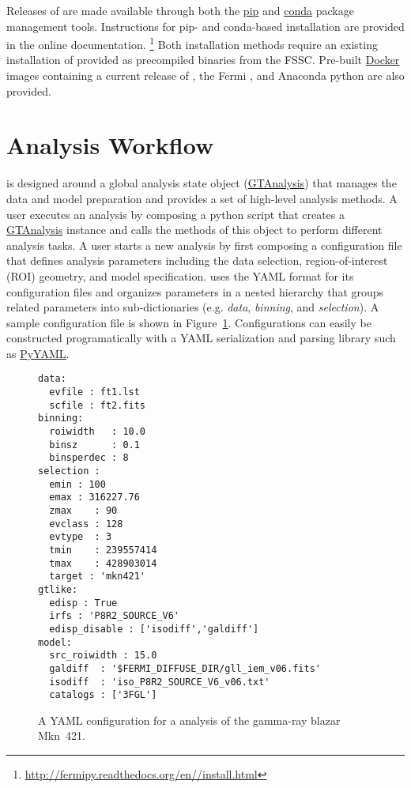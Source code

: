\documentclass{PoS}
\newcommand{\url}[1]{\href{#1}{#1}}
\begin{document}
Releases of {\fermipy} are made available through both the
\href{https://pip.pypa.io/en/latest/}{pip} and
\href{https://conda.io/docs/index.html}{conda} package management
tools.  Instructions for pip- and conda-based installation are
provided in the online documentation.
\footnote{\url{http://fermipy.readthedocs.org/en/\version/install.html}}
Both installation methods require an existing installation of
{\stools} provided as precompiled binaries from the FSSC.  Pre-built
\href{https://www.docker.com}{Docker} images containing a current
release of {\fermipy}, the Fermi {\stools}, and Anaconda python are
also provided.

\section{Analysis Workflow}\label{sec:analysis}

{\fermipy} is designed around a global analysis state object
(\href{http://fermipy.readthedocs.io/en/\version/fermipy.html\#fermipy.gtanalysis.GTAnalysis}{GTAnalysis})
that manages the data and model preparation and provides a set of
high-level analysis methods.  A user executes an analysis by composing
a python script that creates a
\href{http://fermipy.readthedocs.io/en/\version/fermipy.html\#fermipy.gtanalysis.GTAnalysis}{GTAnalysis}
instance and calls the methods of this object to perform different
analysis tasks.  A user starts a new analysis by first composing a
configuration file that defines analysis parameters including the data
selection, region-of-interest (ROI) geometry, and model specification.
{\fermipy} uses the YAML format for its configuration files and
organizes parameters in a nested hierarchy that groups related
parameters into sub-dictionaries (e.g. \textit{data},
\textit{binning}, and \textit{selection}).
A sample configuration file is shown
in Figure~\ref{fig:fermipy_config}.  Configurations can easily be
constructed programatically with a YAML serialization and parsing
library such as \href{http://pyyaml.org/wiki/PyYAML}{PyYAML}.

\begin{figure}[t]
\begin{lstlisting}
data:
  evfile : ft1.lst
  scfile : ft2.fits
binning:
  roiwidth   : 10.0
  binsz      : 0.1
  binsperdec : 8
selection :
  emin : 100
  emax : 316227.76
  zmax    : 90
  evclass : 128
  evtype  : 3
  tmin    : 239557414
  tmax    : 428903014
  target : 'mkn421'
gtlike:
  edisp : True
  irfs : 'P8R2_SOURCE_V6'
  edisp_disable : ['isodiff','galdiff']
model:
  src_roiwidth : 15.0
  galdiff  : '$FERMI_DIFFUSE_DIR/gll_iem_v06.fits'
  isodiff  : 'iso_P8R2_SOURCE_V6_v06.txt'
  catalogs : ['3FGL']
\end{lstlisting}
\caption{A YAML configuration for a {\fermipy} analysis of the gamma-ray blazar Mkn~421.\label{fig:fermipy_config}}
\end{figure}
\end{document}

